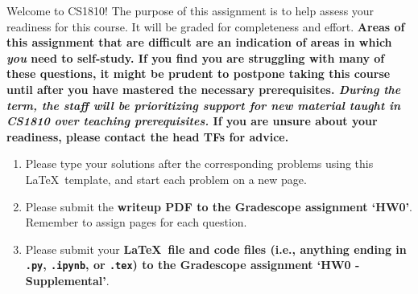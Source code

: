 \documentclass{../harvardml}
\theoremstyle{definition}
\theoremstyle{plain}
\begin{document}
\noindent Welcome to CS1810! The purpose of this assignment is to help assess your readiness for this course.  It will be graded for completeness and effort.  \textbf{Areas of this assignment that are difficult are an indication of areas in which \emph{you} need to self-study. If you find you are struggling with many of these questions, it might be prudent to postpone taking this course until after you have mastered the necessary prerequisites.  \emph{During the term, the staff will be prioritizing support for new material taught in CS1810 over teaching prerequisites.}  If you are unsure about your readiness, please contact the head TFs for advice.}


\begin{enumerate}
    \item Please type your solutions after the corresponding problems using this \LaTeX\ template, and start each problem on a new page.
    \item Please submit the \textbf{writeup PDF to the Gradescope assignment `HW0'}. Remember to assign pages for each question.
    \item Please submit your \textbf{\LaTeX\ file and code files (i.e., anything ending in \texttt{.py}, \texttt{.ipynb}, or \texttt{.tex}) to the Gradescope assignment `HW0 - Supplemental'}. 
\end{enumerate}
\end{document}
